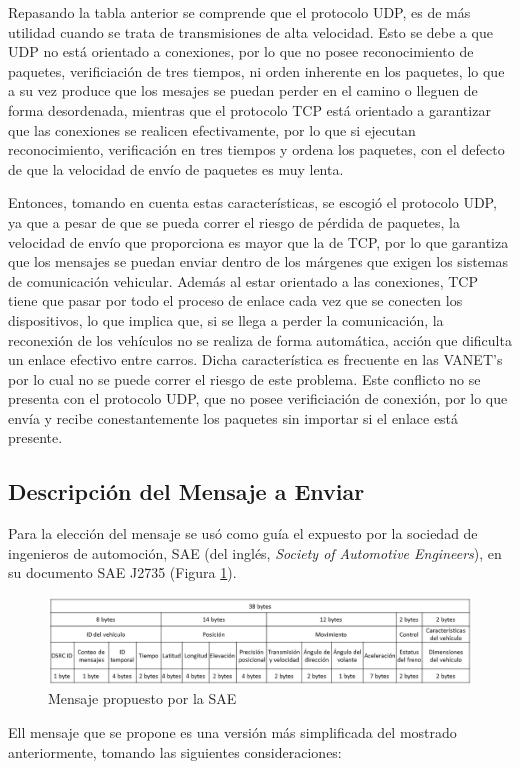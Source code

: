 \par Repasando la tabla anterior se comprende que el protocolo UDP, es de más utilidad cuando se trata de transmisiones de alta velocidad. Esto se debe a que UDP no está orientado a conexiones, por lo que no posee reconocimiento de paquetes, verificiación de tres tiempos, ni orden inherente en los paquetes, lo que a su vez produce que los mesajes se puedan perder en el camino o lleguen de forma desordenada, mientras que el protocolo TCP  está orientado a garantizar que las conexiones se realicen efectivamente, por lo que si ejecutan reconocimiento, verificación en tres tiempos y ordena los paquetes, con el defecto de que la velocidad de envío de paquetes es muy lenta.\\
\par Entonces, tomando en cuenta estas características, se escogió el protocolo UDP, ya que a pesar de que se pueda correr el riesgo de pérdida de paquetes, la velocidad de envío que proporciona es mayor que la de TCP, por lo que garantiza que los mensajes se puedan enviar dentro de los márgenes que exigen los sistemas de comunicación vehicular. Además al estar orientado a las conexiones, TCP tiene que pasar por todo el proceso de enlace cada vez que se conecten los dispositivos, lo que implica que, si se llega a perder la comunicación, la reconexión de los vehículos no se realiza de forma automática, acción que dificulta un enlace efectivo entre carros. Dicha característica es frecuente en las VANET's por lo cual no se puede correr el riesgo de este problema. Este conflicto no se presenta con el protocolo UDP, que no posee verificiación de conexión, por lo que envía y recibe conestantemente los paquetes sin importar si el enlace está presente.\\

\subsection{Descripción del Mensaje a Enviar}
Para la elección del mensaje se usó como guía el expuesto por la sociedad de ingenieros de automoción, SAE (del inglés,\textit{ Society of Automotive Engineers}), en su documento SAE J2735 \cite{park2011integrated} (Figura \ref{fig:men1}).\\

\begin{figure}[!h]
	\centering
		\includegraphics[scale=0.6]{Imagenes/men1}
		\caption{Mensaje propuesto por la SAE}
		\label{fig:men1}
	\end{figure}	
\par Ell mensaje que se propone es una versión más simplificada del mostrado anteriormente, tomando las siguientes consideraciones:

